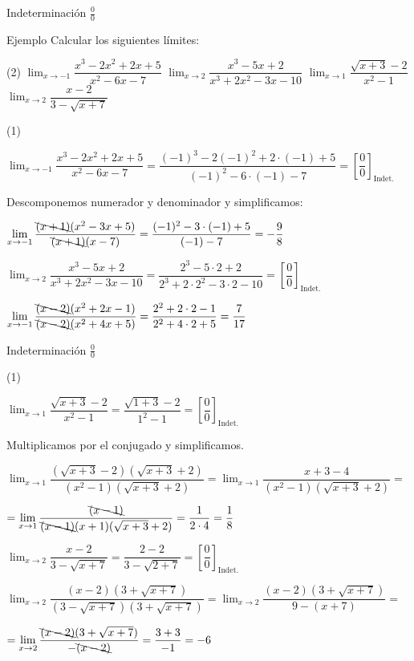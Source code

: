 \documentclass[8pt,handout]{beamer}
\newcommand{\limite}[2]{\displaystyle \lim_{x \rightarrow #1}{#2}}
\begin{document}
\begin{frame}{Indeterminación $\frac{0}{0}$}
\begin{exampleblock}{Ejemplo}
Calcular los siguientes límites:
\begin{tasks}[label=\alph*)](2)
\task $\limite{-1}{\dfrac{x^3-2x^2+2x+5}{x^2-6x-7}}$
\task $\limite{2}{\dfrac{x^3-5x+2}{x^3+2x^2-3x-10}}$
\task $\limite{1}{\dfrac{\sqrt{x+3}-2}{x^2-1}}$
\task $\limite{2}{\dfrac{x-2}{3-\sqrt{x+7}}}$
\end{tasks}
\end{exampleblock}

\begin{tasks}[label=\alph* )](1)

\task $\limite{-1}{\dfrac{x^3-2x^2+2x+5}{x^2-6x-7}} = \dfrac{(-1)^3-2(-1)^2+2\cdot(-1)+5}{(-1)^2-6\cdot (-1)-7} = \left[\dfrac{0}{0}\right]_{\text{Indet.}}$

Descomponemos numerador y denominador y simplificamos:

$\limite{-1}{\dfrac{\bcancel{(x+1)}(x^2-3x+5)}{\bcancel{(x+1)}(x-7)}} = \dfrac{(-1)^2-3\cdot(-1)+5}{ (-1)-7}=-\dfrac{9}{8}$ 

\task $\limite{2}{\dfrac{x^3-5x+2}{x^3+2x^2-3x-10}}= \dfrac{2^3-5 \cdot 2+2}{2^3+2\cdot 2^2-3\cdot 2-10}= \left[\dfrac{0}{0}\right]_{\text{Indet.}} $

$\limite{-1}{\dfrac{\bcancel{(x-2)}(x^2+2x-1)}{\bcancel{(x-2)}(x^2+4x+5)}} = \dfrac{2^2+2\cdot2-1}{ 2^2+4\cdot 2 +5}=\dfrac{7}{17}$ 
\end{tasks}
\end{frame}

\begin{frame}{Indeterminación $\frac{0}{0}$}
\begin{tasks}[label=\alph*),resume](1)

\task $\limite{1}{\dfrac{\sqrt{x+3}-2}{x^2-1}} = \dfrac{\sqrt{1+3}-2}{1^2-1} = \left[\dfrac{0}{0}\right]_{\text{Indet.}} $

\vspace{10pt}
Multiplicamos por el conjugado y simplificamos.

\vspace{10pt}
$\limite{1}{\dfrac{(\sqrt{x+3}-2)(\sqrt{x+3}+2)}{(x^2-1)(\sqrt{x+3}+2)}} = \limite{1}{\dfrac{x+3-4}{(x^2-1)(\sqrt{x+3}+2)}} = $

\vspace{10pt}
$= \limite{1}{\dfrac{\bcancel{(x-1)}}{\bcancel{(x-1)}(x+1)(\sqrt{x+3}+2)}}= \dfrac{1}{2 \cdot 4}= \dfrac{1}{8}$

\task  $\limite{2}{\dfrac{x-2}{3-\sqrt{x+7}}} =  \dfrac{2-2}{3-\sqrt{2+7}} =  \left[\dfrac{0}{0}\right]_{\text{Indet.}}$

\vspace{10pt}
$\limite{2}{\dfrac{(x-2)(3+\sqrt{x+7})}{(3-\sqrt{x+7})(3+\sqrt{x+7})}}= \limite{2}{\dfrac{(x-2)(3+\sqrt{x+7})}{9-(x+7)}}= $

\vspace{10pt}
$= \limite{2}{\dfrac{\bcancel{(x-2)}(3+\sqrt{x+7})}{-\bcancel{(x-2)}}} = \dfrac{3+3}{-1}= -6 $

\end{tasks}

\end{frame}
\end{document}
